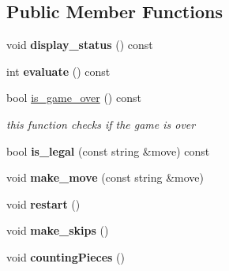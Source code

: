 \subsection*{Public Member Functions}
\begin{DoxyCompactItemize}
\item 
\mbox{\label{classmain__savitch__14_1_1_othello_ab01a4f7aba130133221a11224905e8ce}} 
void {\bfseries display\+\_\+status} () const
\item 
\mbox{\label{classmain__savitch__14_1_1_othello_a57ae44590de8d683592f186ed6bd25b0}} 
int {\bfseries evaluate} () const
\item 
bool \hyperlink{classmain__savitch__14_1_1_othello_a540c8b0030e429e0ac30f07e9e8868ec}{is\+\_\+game\+\_\+over} () const
\begin{DoxyCompactList}\small\item\em this function checks if the game is over \end{DoxyCompactList}\item 
\mbox{\label{classmain__savitch__14_1_1_othello_a74ac0d4e6399167037dfc708efdb9033}} 
bool {\bfseries is\+\_\+legal} (const string \&move) const
\item 
\mbox{\label{classmain__savitch__14_1_1_othello_a1066b280efa5cb41039585669282fe06}} 
void {\bfseries make\+\_\+move} (const string \&move)
\item 
\mbox{\label{classmain__savitch__14_1_1_othello_abf872b8074bfa4c04119317dc3b39af2}} 
void {\bfseries restart} ()
\item 
\mbox{\label{classmain__savitch__14_1_1_othello_a3177234195a490eef52343d957e64b5d}} 
void {\bfseries make\+\_\+skips} ()
\item 
\mbox{\label{classmain__savitch__14_1_1_othello_a19f49edfbe82b84922877e00bc854ed8}} 
void {\bfseries counting\+Pieces} ()
\item 
\mbox{\label{classmain__savitch__14_1_1_othello_a21440dbb4511812a76c578a5f546710b}} 

\end{DoxyCompactItemize}
